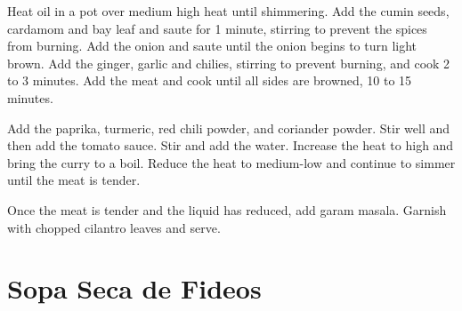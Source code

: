\documentclass[oneside]{book}  %
\def\thisrecipe{}  %
\newcommand{\recipe}[1]{\section{#1}\def\thisrecipe{: #1}} %
\begin{document}
\begin{directions}
  \item Heat oil in a pot over medium high heat until shimmering. Add the cumin
    seeds, cardamom and bay leaf and saute for 1 minute, stirring to prevent the
    spices from burning. Add the onion and saute until the onion begins to turn
    light brown. Add the ginger, garlic and chilies, stirring to prevent
    burning, and cook 2 to 3 minutes. Add the meat and cook until all sides are
    browned, 10 to 15 minutes.

  \item Add the paprika, turmeric, red chili powder, and coriander powder. Stir
    well and then add the tomato sauce. Stir and add the water. Increase the
    heat to high and bring the curry to a boil. Reduce the heat to medium-low
    and continue to simmer until the meat is tender.

  \columnbreak

  \item Once the meat is tender and the liquid has reduced, add garam masala.
    Garnish with chopped cilantro leaves and serve.
\end{directions}
\recipe{Sopa Seca de Fideos} \label{recipe:sopa_seca_de_fideos} %
\end{document}

